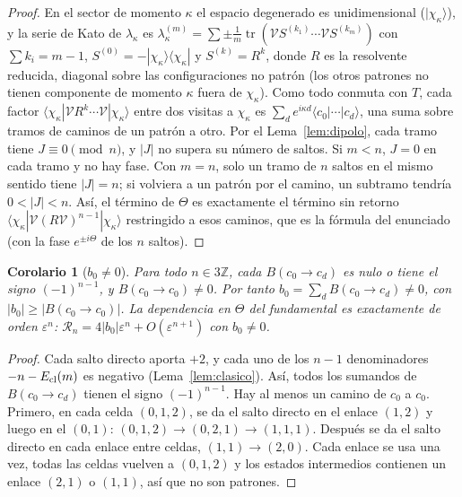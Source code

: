 \documentclass[11pt,a4paper]{article}
\newtheorem{corolario}[teorema]{Corolario}
\theoremstyle{definition}
\theoremstyle{remark}
\newcommand{\tr}{\operatorname{tr}}
\newcommand{\ket}[1]{|#1\rangle}
\newcommand{\bra}[1]{\langle #1|}
\newcommand{\eps}{\varepsilon}
\begin{document}
\begin{proof}
En el sector de momento $\kappa$ el espacio degenerado es unidimensional ($\ket{\chi_\kappa}$), y la serie de
Kato de $\lambda_\kappa$ es $\lambda_\kappa^{(m)}=\sum\pm\frac1m\tr(\mathcal VS^{(k_1)}\cdots\mathcal VS^{(k_m)})$ con
$\sum k_i=m-1$, $S^{(0)}=-\ket{\chi_\kappa}\bra{\chi_\kappa}$ y $S^{(k)}=R^k$, donde $R$ es la resolvente reducida,
diagonal sobre las configuraciones no patrón (los otros patrones no tienen componente de momento $\kappa$
fuera de $\chi_\kappa$). Como todo conmuta con $T$, cada factor $\bra{\chi_\kappa}\mathcal V R^{k}\cdots\mathcal V\ket{\chi_\kappa}$
entre dos visitas a $\chi_\kappa$ es $\sum_de^{i\kappa d}\bra{c_0}\cdots\ket{c_d}$, una suma sobre tramos de caminos
de un patrón a otro. Por el Lema~\ref{lem:dipolo}, cada tramo tiene $J\equiv0\pmod n$, y $|J|$ no supera
su número de saltos. Si $m<n$, $J=0$ en cada tramo y no hay fase. Con $m=n$, solo un tramo de $n$ saltos
en el mismo sentido tiene $|J|=n$; si volviera a un patrón por el camino, un subtramo tendría
$0<|J|<n$. Así, el término de $\Theta$ es exactamente el término sin retorno
$\bra{\chi_\kappa}\mathcal V(R\mathcal V)^{n-1}\ket{\chi_\kappa}$ restringido a esos caminos, que es la fórmula del enunciado
(con la fase $e^{\pm i\Theta}$ de los $n$ saltos).
\end{proof}

\begin{corolario}[$b_0\ne0$]\label{cor:b0}
Para todo $n\in3\mathbb Z$, cada $B(c_0\to c_d)$ es nulo o tiene el signo $(-1)^{n-1}$, y
$B(c_0\to c_0)\ne0$. Por tanto $b_0=\sum_dB(c_0\to c_d)\ne0$, con $|b_0|\ge|B(c_0\to c_0)|$. La dependencia en
$\Theta$ del fundamental es exactamente de orden $\eps^n$: $\mathcal R_n=4|b_0|\eps^n+O(\eps^{n+1})$ con
$b_0\ne0$.
\end{corolario}

\begin{proof}
Cada salto directo aporta $+2$, y cada uno de los $n-1$ denominadores $-n-E_{\rm cl}(m)$ es negativo
(Lema~\ref{lem:clasico}). Así, todos los sumandos de $B(c_0\to c_d)$ tienen el signo $(-1)^{n-1}$. Hay
al menos un camino de $c_0$ a $c_0$. Primero, en cada celda $(0,1,2)$, se da el salto directo en el enlace
$(1,2)$ y luego en el $(0,1)$: $(0,1,2)\to(0,2,1)\to(1,1,1)$. Después se da el salto directo en cada enlace
entre celdas, $(1,1)\to(2,0)$. Cada enlace se usa una vez, todas las celdas vuelven a $(0,1,2)$ y los
estados intermedios contienen un enlace $(2,1)$ o $(1,1)$, así que no son patrones.
\end{proof}
\end{document}
